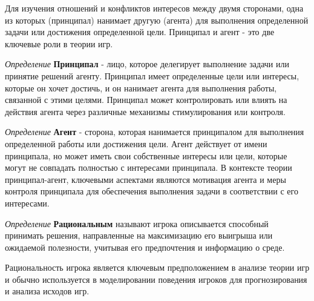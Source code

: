 Для изучения отношений и конфликтов интересов между двумя сторонами, одна из которых (принципал) нанимает другую (агента) для выполнения определенной задачи или достижения определенной цели. Принципал и агент - это две ключевые роли в теории игр.


\textit{Определение} \textbf{Принципал} -  лицо, которое делегирует выполнение задачи или принятие решений агенту. Принципал имеет определенные цели или интересы, которые он хочет достичь, и он нанимает агента для выполнения работы, связанной с этими целями. Принципал может контролировать или влиять на действия агента через различные механизмы стимулирования или контроля.

\textit{Определение}  \textbf{Агент} - сторона, которая нанимается принципалом для выполнения определенной работы или достижения цели. Агент действует от имени принципала, но может иметь свои собственные интересы или цели, которые могут не совпадать полностью с интересами принципала. В контексте теории принципал-агент, ключевыми аспектами являются мотивация агента и меры контроля принципала для обеспечения выполнения задачи в соответствии с его интересами.


\textit{Определение} \textbf{Рациональным} называют игрока описывается способный принимать решения, направленные на максимизацию его выигрыша или ожидаемой полезности, учитывая его предпочтения и информацию о среде.

Рациональность игрока является ключевым предположением в анализе теории игр и обычно используется в моделировании поведения игроков для прогнозирования и анализа исходов игр.


